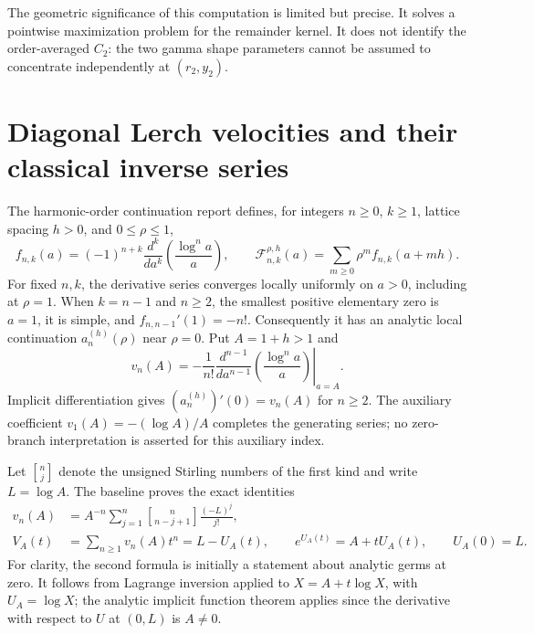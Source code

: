 \documentclass[11pt]{article}
\numberwithin{equation}{section}
\theoremstyle{definition}
\theoremstyle{remark}
\newcommand{\stirling}[2]{\genfrac{[}{]}{0pt}{}{#1}{#2}}
\begin{document}
The geometric significance of this computation is limited but precise.
It solves a pointwise maximization problem for the remainder kernel.
It does not identify the order-averaged $C_2$: the two gamma shape
parameters cannot be assumed to concentrate independently at
$(r_2,y_2)$.


\section{Diagonal Lerch velocities and their classical inverse series}
\label{sec:diagonal-inverse}

The harmonic-order continuation report \cite{HarmonicBaseline} defines,
for integers $n\geq 0$, $k\geq 1$, lattice spacing $h>0$, and
$0\leq\rho\leq1$,
\[
 f_{n,k}(a)=(-1)^{n+k}\frac{d^k}{da^k}
                  \left(\frac{\log^n a}{a}\right),\qquad
 \mathscr F_{n,k}^{\rho,h}(a)
       =\sum_{m\geq0}\rho^m f_{n,k}(a+mh).
\]
For fixed $n,k$, the derivative series converges locally uniformly on
$a>0$, including at $\rho=1$.  When $k=n-1$ and $n\geq2$, the smallest
positive elementary zero is $a=1$, it is simple, and
$f_{n,n-1}'(1)=-n!$.  Consequently it has an analytic local continuation
$a_n^{(h)}(\rho)$ near $\rho=0$.  Put $A=1+h>1$ and
\begin{equation}\label{eq:velocity-normalization}
 v_n(A)=-\frac1{n!}
   \left.\frac{d^{n-1}}{da^{n-1}}
                  \left(\frac{\log^n a}{a}\right)\right|_{a=A}.
\end{equation}
Implicit differentiation gives
$(a_n^{(h)})'(0)=v_n(A)$ for $n\geq2$.  The auxiliary coefficient
$v_1(A)=-(\log A)/A$ completes the generating series; no zero-branch
interpretation is asserted for this auxiliary index.

Let $\stirling{n}{j}$ denote the unsigned Stirling numbers of
the first kind and write $L=\log A$.  The baseline proves the exact
identities
\begin{align}
 v_n(A)&=A^{-n}\sum_{j=1}^n
           \stirling{n}{n-j+1}\frac{(-L)^j}{j!},
                  \label{eq:velocity-stirling}\\
 V_A(t)&=\sum_{n\geq1}v_n(A)t^n=L-U_A(t),\qquad
 e^{U_A(t)}=A+tU_A(t),\qquad U_A(0)=L.
                  \label{eq:velocity-inverse}
\end{align}
For clarity, the second formula is initially a statement about analytic
germs at zero.  It follows from Lagrange inversion \cite{Gessel2016} applied to
$X=A+t\log X$, with $U_A=\log X$; the analytic implicit function theorem
applies since the derivative with respect to $U$ at $(0,L)$ is $A\neq0$.
\end{document}
